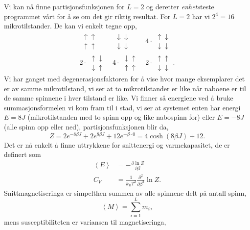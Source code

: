 \documentclass[norsk, 10pt]{article}
\def\mean#1{\left\langle #1 \right\rangle}
\begin{document}
Vi kan nå finne partisjonsfunksjonen for $L=2$ og deretter \emph{enhets}teste programmet vårt for å se om det gir riktig resultat. For $L=2$ har vi $2^{4}=16$ mikrotilstander. De kan vi enkelt tegne opp,
\begin{eqnarray}
	\begin{matrix} \uparrow\uparrow \\ \uparrow\uparrow \end{matrix} & \begin{matrix} \downarrow\downarrow \\ \downarrow\downarrow \end{matrix} & 4\cdot \begin{matrix} \uparrow\downarrow \\ \downarrow\downarrow \end{matrix}\\ 2\cdot\begin{matrix} \uparrow\downarrow \\ \downarrow\uparrow \end{matrix} & 4\cdot \begin{matrix} \downarrow\uparrow \\ \uparrow\uparrow \end{matrix} & 2\cdot\begin{matrix} \uparrow\uparrow \\ \downarrow\downarrow \end{matrix}.
\end{eqnarray}
Vi har ganget med degenerasjonsfaktoren for å vise hvor mange eksemplarer det er av samme mikrotilstand, vi ser at to mikrotilstander er like når naboene er til de samme spinnene i hver tilstand er like. Vi finner så energiene ved å bruke summasjonsformelen vi kom fram til i stad, vi ser at systemet enten har energi $E = 8J$ (mikrotilstanden med to spinn opp og like nabospinn for) eller $E = -8J$ (alle spinn opp eller ned), partisjonsfunksjonen blir da,
$$ Z = 2e^{-8\beta J} + 2e^{8\beta J} + 12e^{-\beta \cdot0} = 4\cosh(8\beta J) + 12. $$
Det er nå enkelt å finne uttrykkene for snittenergi og varmekapasitet, de er definert som
\begin{align*}
	\mean E &= -\frac{\partial \ln Z}{\partial \beta} \\
	C_V &= \frac{1}{k_B T^2} \frac{\partial^2}{\partial \beta^2}\ln Z.
\end{align*}
Snittmagnetiseringa er simpelthen summen av alle spinnene delt på antall spinn,
$$ \mean M = \sum\limits_{i=1}^{L} m_i,$$
mens susceptibiliteten er variansen til magnetiseringa,
\end{document}
